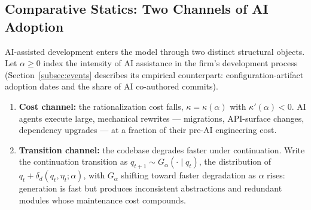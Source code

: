%
%

\subsection{Comparative Statics: Two Channels of AI Adoption}
\label{subsec:twochannel}

AI-assisted development enters the model through two distinct structural
objects. Let $\alpha \geq 0$ index the intensity of AI assistance in the
firm's development process (Section~\ref{subsec:events} describes its
empirical counterpart: configuration-artifact adoption dates and the share
of AI co-authored commits).

\begin{enumerate}
    \item \textbf{Cost channel:} the rationalization cost falls,
    $\kappa = \kappa(\alpha)$ with $\kappa'(\alpha) < 0$. AI agents execute
    large, mechanical rewrites --- migrations, API-surface changes,
    dependency upgrades --- at a fraction of their pre-AI engineering cost.
    \item \textbf{Transition channel:} the codebase degrades faster under
    continuation. Write the continuation transition as
    $q_{t+1} \sim G_\alpha(\cdot \mid q_t)$, the distribution of
    $q_t + \delta_d(q_t, \eta_t; \alpha)$, with $G_\alpha$ shifting toward
    faster degradation as $\alpha$ rises: generation is fast but produces
    inconsistent abstractions and redundant modules whose maintenance cost
    compounds.
\end{enumerate}

